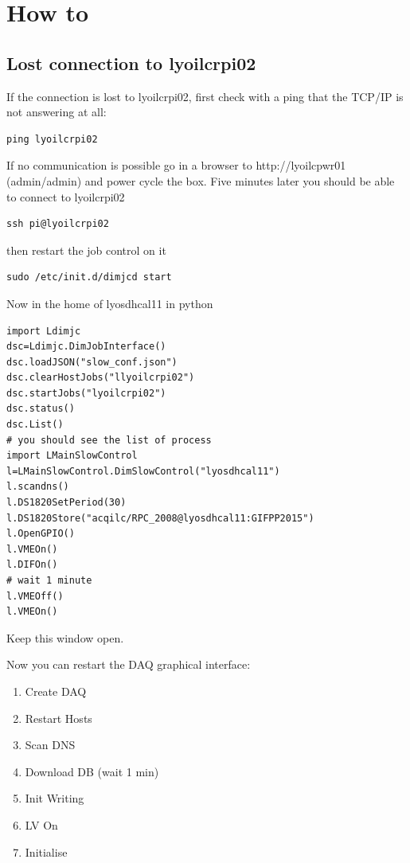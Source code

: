 \documentclass[english]{article}
\begin{document}
\section{How to }

\subsection{Lost connection to lyoilcrpi02}

If the connection is lost to lyoilcrpi02, first check with a ping that the TCP/IP is  not answering at all:
\begin{verbatim}
ping lyoilcrpi02
\end{verbatim}

If no communication is possible go in a browser to http://lyoilcpwr01  (admin/admin) and power cycle the box. Five minutes later you should be able to connect to lyoilcrpi02
 \begin{verbatim}
ssh pi@lyoilcrpi02
\end{verbatim}

then restart the job control on it
\begin{verbatim}
sudo /etc/init.d/dimjcd start
\end{verbatim}


Now in the home of  lyosdhcal11 in python
\begin{verbatim}
import Ldimjc
dsc=Ldimjc.DimJobInterface()
dsc.loadJSON("slow_conf.json")
dsc.clearHostJobs("llyoilcrpi02")
dsc.startJobs("lyoilcrpi02")
dsc.status()
dsc.List()
# you should see the list of process
import LMainSlowControl
l=LMainSlowControl.DimSlowControl("lyosdhcal11")
l.scandns()
l.DS1820SetPeriod(30)
l.DS1820Store("acqilc/RPC_2008@lyosdhcal11:GIFPP2015")
l.OpenGPIO()
l.VMEOn()
l.DIFOn()
# wait 1 minute
l.VMEOff()
l.VMEOn()

\end{verbatim}

Keep this window open.

Now you can restart the DAQ graphical interface:
\begin{enumerate}
\item Create DAQ
\item Restart Hosts
\item Scan DNS
\item Download DB (wait 1 min)
\item Init Writing
\item LV On
\item Initialise
\end{enumerate}
\end{document}
